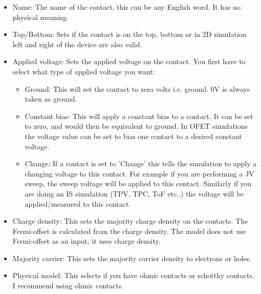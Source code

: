 \begin{itemize}
  \item Name: The name of the contact, this can be any English word. It has no physical meaning.
  \item Top/Bottom: Sets if the contact is on the top, bottom or in 2D simulation left and right of the device are also valid.
  \item Applied voltage: Sets the applied voltage on the contact. You first have to select what type of applied voltage you want:
		\begin{itemize}
		\item Ground: This will set the contact to zero volts i.e. ground. 0V is always taken as ground.
		\item Constant bias: This will apply a constant bias to a contact.  It can be set to zero, and would then be equivalent to ground.  In OFET simulations the voltage value can be set to bias one contact to a desired constant voltage.
		\item Change: If a contact is set to 'Change' this tells the simulation to apply a changing voltage to this contact. For example if you are performing a JV sweep, the sweep voltage will be applied to this contact.  Similarly if you are doing an IS simulation (TPV, TPC, ToF etc..) the voltage will be applied/measured to this contact.
		\end{itemize}
  \item Charge density: This sets the majority charge density on the contacts. The Fermi-offset is calculated from the charge density. The model does not use Fermi-offset as an input, it uses charge density.
  \item Majority carrier: This sets the majority carrier density to electrons or holes.
  \item Physical model: This selects if you have ohmic contacts or schottky contacts. I recommend using ohmic contacts.

\end{itemize}

\\

